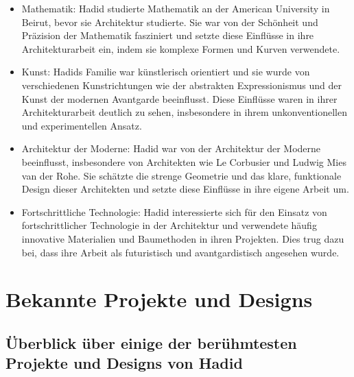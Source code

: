\documentclass[a4paper, 12p]{article}
\begin{document}
\begin{itemize}
\item Mathematik: Hadid studierte Mathematik an der American University in Beirut,
bevor sie Architektur studierte. Sie war von der Schönheit und Präzision der
Mathematik fasziniert und setzte diese Einflüsse in ihre Architekturarbeit ein,
indem sie komplexe Formen und Kurven verwendete.
\item Kunst: Hadids Familie war künstlerisch orientiert und sie wurde von
verschiedenen Kunstrichtungen wie der abstrakten Expressionismus und der Kunst
der modernen Avantgarde beeinflusst. Diese Einflüsse waren in ihrer
Architekturarbeit deutlich zu sehen, insbesondere in ihrem unkonventionellen und
experimentellen Ansatz.
\item Architektur der Moderne: Hadid war von der Architektur der Moderne beeinflusst,
insbesondere von Architekten wie Le Corbusier und Ludwig Mies van der Rohe. Sie
schätzte die strenge Geometrie und das klare, funktionale Design dieser
Architekten und setzte diese Einflüsse in ihre eigene Arbeit um.
\item Fortschrittliche Technologie: Hadid interessierte sich für den Einsatz von
fortschrittlicher Technologie in der Architektur und verwendete häufig
innovative Materialien und Baumethoden in ihren Projekten. Dies trug dazu bei,
dass ihre Arbeit als futuristisch und avantgardistisch angesehen wurde.
\end{itemize}

\section{Bekannte Projekte und Designs}
\subsection{Überblick über einige der berühmtesten Projekte und Designs von Hadid}
\end{document}
